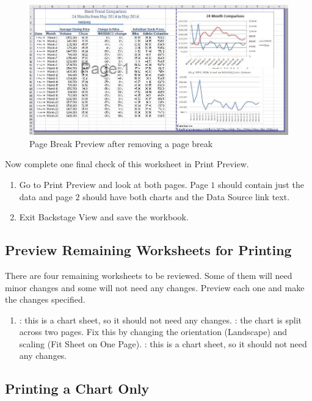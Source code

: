\begin{figure}[H]
	\centering
	\includegraphics[width=\maxwidth{.95\linewidth}]{gfx/ch04_fig52}
	\caption{Page Break Preview after removing a page break}
	\label{04:fig52}
\end{figure}

Now complete one final check of this worksheet in Print Preview.

\begin{enumerate}
	\item Go to Print Preview and look at both pages. Page $ 1 $ should contain just the data and page $ 2 $ should have both charts and the Data Source link text.
	\item Exit Backstage View and save the workbook.
\end{enumerate}

\subsection{Preview Remaining Worksheets for Printing}

There are four remaining worksheets to be reviewed. Some of them will need minor changes and some will not need any changes. Preview each one and make the changes specified.

\begin{enumerate}
	\item {}: this is a chart sheet, so it should not need any changes.
	: the chart is split across two pages. Fix this by changing the orientation (Landscape) and scaling (Fit Sheet on One Page).
	: this is a chart sheet, so it should not need any changes.
\end{enumerate}

\subsection{Printing a Chart Only}

